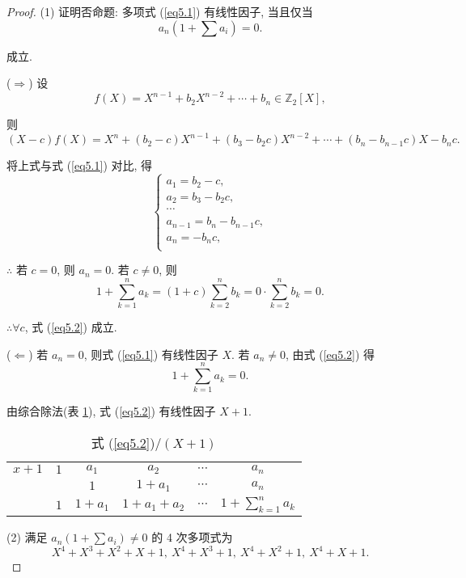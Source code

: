 \documentclass[UTF8]{ctexart}
\begin{document}
\begin{proof}
    (1) 证明否命题: 多项式 (\ref{eq5.1}) 有线性因子, 当且仅当
    \begin{equation}\label{eq5.2}
        a_n(1+\sum a_i)=0.
    \end{equation}
    
    成立.

    ($\Rightarrow$) 设
    \[f(X)=X^{n-1}+b_2X^{n-2}+\cdots+b_n\in\mathbb{Z}_2[X],\]

    则
    \[(X-c)f(X)=X^n+(b_2-c)X^{n-1}+(b_3-b_2c)X^{n-2}+\cdots+(b_n-b_{n-1}c)X-b_nc.\]

    将上式与式 (\ref{eq5.1}) 对比, 得
    \[\begin{cases}
        a_1=b_2-c, \\
        a_2=b_3-b_2c, \\
        \cdots \\
        a_{n-1}=b_n-b_{n-1}c, \\
        a_n=-b_nc, \\
    \end{cases}\]

    $\therefore$ 若 $c=0$, 则 $a_n=0$. 若 $c\neq0$, 则
    \[1+\sum\limits_{k=1}^na_k=(1+c)\sum\limits_{k=2}^nb_k=0\cdot\sum\limits_{k=2}^nb_k=0.\]

    $\therefore\forall c$, 式 (\ref{eq5.2}) 成立.

    ($\Leftarrow$) 若 $a_n=0$, 则式 (\ref{eq5.1}) 有线性因子 $X$. 若 $a_n\neq0$, 由式 (\ref{eq5.2}) 得
    \[1+\sum\limits_{k=1}^na_k=0.\]

    由综合除法(表 \ref{tb2}), 式 (\ref{eq5.2}) 有线性因子 $X+1$.
    \begin{table}\caption{式 (\ref{eq5.2})$/(X+1)$}\label{tb2}
        \begin{center}
            \begin{tabular}{c|ccccc}
                $x+1$             & $1$ & $a_1$   & $a_2$         & $\cdots$ & $a_n$ \\
                                  &     & $1$     & $1+a_1$       & $\cdots$ & $a_n$ \\
                \cline{2-6}
                \multicolumn{2}{r}{$1$} & $1+a_1$ & $1+a_1+a_2$   & $\cdots$ & $1+\sum\limits_{k=1}^na_k$
                \end{tabular}
        \end{center}
    \end{table}

    (2) 满足 $a_n(1+\sum a_i)\neq0$ 的 4 次多项式为
    \[X^4+X^3+X^2+X+1,\ X^4+X^3+1,\ X^4+X^2+1,\ X^4+X+1.\]


\end{proof}
\end{document}
